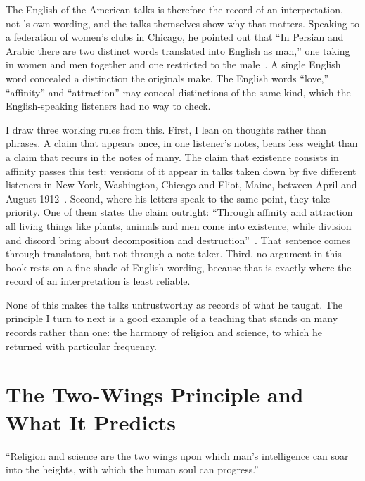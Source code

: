 The English of the American talks is therefore the record of an
interpretation, not \AbdulBaha's own wording, and the talks themselves show
why that matters.
Speaking to a federation of women's clubs in Chicago, he pointed out that ``In
Persian and Arabic there are two distinct words translated into English as
man,'' one taking in women and men together and one restricted to the
male~\citep[Talk~32]{PUP}.
A single English word concealed a distinction the originals make.
The English words ``love,'' ``affinity'' and ``attraction'' may conceal
distinctions of the same kind, which the English-speaking listeners had no way
to check.

I draw three working rules from this.
First, I lean on thoughts rather than phrases.
A claim that appears once, in one listener's notes, bears less weight than a
claim that recurs in the notes of many.
The claim that existence consists in affinity passes this test: versions of it
appear in talks taken down by five different listeners in New York,
Washington, Chicago and Eliot, Maine, between April and August
1912~\citep[Talks~2, 23, 41, 48, 74, 89, 92]{PUP}.
Second, where his letters speak to the same point, they take priority.
One of them states the claim outright: ``Through affinity and attraction all
living things like plants, animals and men come into existence, while division
and discord bring about decomposition and
destruction''~\citep[\S 225]{SelectionsAbdul}.
That sentence comes through translators, but not through a note-taker.
Third, no argument in this book rests on a fine shade of English wording,
because that is exactly where the record of an interpretation is least
reliable.

None of this makes the talks untrustworthy as records of what he taught.
The principle I turn to next is a good example of a teaching that stands on
many records rather than one: the harmony of religion and science, to which he
returned with particular frequency.

\section{The Two-Wings Principle and What It Predicts}
\label{sec:ch3-two-wings}

``Religion and science are the two wings upon which man's intelligence
can soar into the heights, with which the human soul can progress.''

